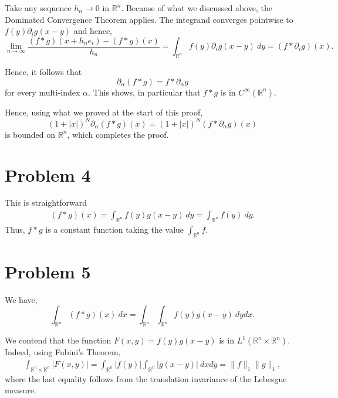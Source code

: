 \documentclass[12pt]{amsart}
\newcommand{\R}{\mathbb{R}}
\begin{document}
Take any sequence $h_n\to 0$ in $\R^n$. Because of what we discussed above, the Dominated Convergence Theorem applies. The integrand converges pointwise to $f(y)\partial_i g(x - y)$ and hence, 
\begin{equation*}
    \lim_{n\to\infty}\frac{(f\ast g)(x + h_ne_i) - (f\ast g)(x)}{h_n} = \int_{\R^n} f(y)\partial_i g(x - y)~dy = (f\ast\partial_i g)(x).
\end{equation*}

Hence, it follows that 
\begin{equation*}
    \partial_\alpha (f\ast g) = f\ast\partial_\alpha g
\end{equation*}
for every multi-index $\alpha$. This shows, in particular that $f\ast g$ is in $C^\infty(\R^n)$.

Hence, using what we proved at the start of this proof, 
\begin{equation*}
    (1 + |x|)^N\partial_\alpha(f\ast g)(x) = (1 + |x|)^N (f\ast\partial_\alpha g)(x)
\end{equation*}
is bounded on $\R^n$, which completes the proof.

\section*{Problem 4}

This is straightforward 
\begin{align*}
    (f\ast g)(x) = \int_{\R^n} f(y)g(x - y)~dy = \int_{\R^n} f(y)~dy.
\end{align*}
Thus, $f\ast g$ is a constant function taking the value $\int_{\R^n}f$.

\section*{Problem 5}

We have,
\begin{equation*}
    \int_{\R^n} (f\ast g)(x)~dx = \int_{\R^n}\int_{\R^n} f(y)g(x - y)~dydx.
\end{equation*}

We contend that the function $F(x,y) = f(y)g(x - y)$ is in $L^1(\R^n\times\R^n)$. Indeed, using Fubini's Theorem, 
\begin{align*}
    \int_{\R^n\times\R^n}|F(x,y)| = \int_{\R^n}|f(y)|\int_{\R^n}|g(x - y)|~dxdy = \|f\|_1\|g\|_1,
\end{align*}
where the last equality follows from the translation invariance of the Lebesgue measure.
\end{document}
